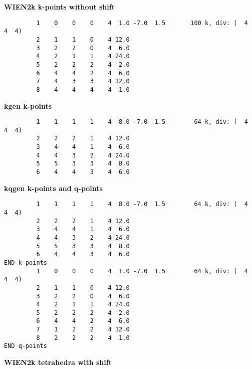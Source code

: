{\bf WIEN2k k-points without shift}

\begin{verbatim}
         1    0    0    0    4  1.0 -7.0  1.5       100 k, div: (  4  4  4)
         2    1    1    0    4 12.0
         3    2    2    0    4  6.0
         4    2    1    1    4 24.0
         5    2    2    2    4  2.0
         6    4    4    2    4  6.0
         7    4    3    3    4 12.0
         8    4    4    4    4  1.0
\end{verbatim}

{\bf kgen k-points}

\begin{verbatim}
         1    1    1    1    4  8.0 -7.0  1.5        64 k, div: (  4  4  4)
         2    2    2    1    4 12.0
         3    4    4    1    4  6.0
         4    4    3    2    4 24.0
         5    5    3    3    4  8.0
         6    4    4    3    4  6.0
\end{verbatim}

{\bf kqgen k-points and q-points}

\begin{verbatim}
         1    1    1    1    4  8.0 -7.0  1.5        64 k, div: (  4  4  4)
         2    2    2    1    4 12.0
         3    4    4    1    4  6.0
         4    4    3    2    4 24.0
         5    5    3    3    4  8.0
         6    4    4    3    4  6.0
END k-points
         1    0    0    0    4  1.0 -7.0  1.5        64 k, div: (  4  4  4)
         2    1    1    0    4 12.0
         3    2    2    0    4  6.0
         4    2    1    1    4 24.0
         5    2    2    2    4  2.0
         6    4    4    2    4  6.0
         7    1    2    2    4 12.0
         8    2    2    2    4  1.0
END q-points
\end{verbatim}


{\bf WIEN2k tetrahedra with shift}

